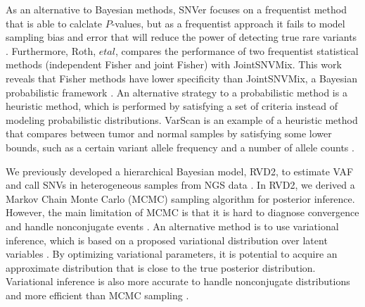 \documentclass[11pt,reqno]{amsart}
\begin{document}
As an alternative to Bayesian methods, SNVer focuses on a frequentist method that is able to calclate $P$-values, but as a frequentist approach it fails to model sampling bias and error that will reduce the power of detecting true rare variants \citep{wei2011snver}.
Furthermore, Roth, $\mathit{et} \mathit{al}$, compares the performance of two frequentist statistical methods (independent Fisher and joint Fisher) with JointSNVMix.
This work reveals that Fisher methods have lower specificity than JointSNVMix, a Bayesian probabilistic framework \citep{roth2012jointsnvmix}.
An alternative strategy to a probabilistic method is a heuristic method, which is performed by satisfying a set of criteria instead of modeling probabilistic distributions.
VarScan is an example of a heuristic method that compares between tumor and normal samples by satisfying some lower bounds, such as a certain variant allele frequency and a number of allele counts \citep{koboldt2012varscan}.

We previously developed a hierarchical Bayesian model, RVD2, to estimate VAF and call SNVs in heterogeneous samples from NGS data \citep{he2015rvd2}.
In RVD2, we derived a Markov Chain Monte Carlo (MCMC) sampling algorithm for posterior inference.
However, the main limitation of MCMC is that it is hard to diagnose convergence and handle nonconjugate events \citep{jordan1999introduction}.
An alternative method is to use variational inference, which is based on a proposed variational distribution over latent variables \citep{jordan1999introduction}.
By optimizing variational parameters, it is potential to acquire an approximate distribution that is close to the true posterior distribution.
Variational inference is also more accurate to handle nonconjugate distributions and more efficient than MCMC sampling \citep{peterson1989explorations}.
\end{document}
